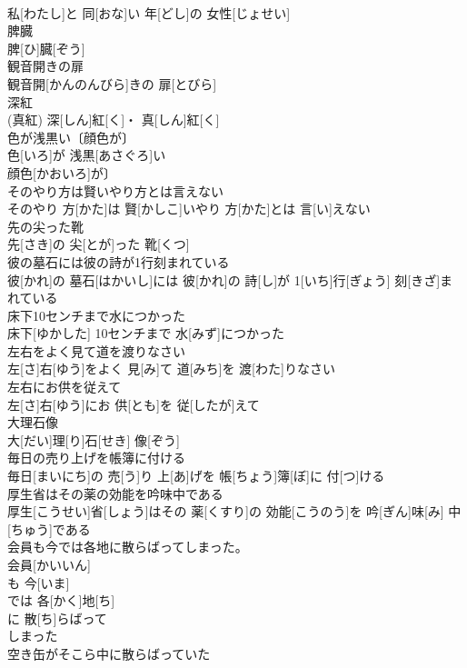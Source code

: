 \documentclass[8pt]{extreport}
\begin{document}
\begin{CJK}{UTF8}{min}
\\	私[わたし]と 同[おな]い 年[どし]の 女性[じょせい]
\\	脾臓	
\\	脾[ひ]臓[ぞう]
\\	観音開きの扉	
\\	観音開[かんのんびら]きの 扉[とびら]
\\	深紅	
\\	(真紅)	深[しん]紅[く]・ 真[しん]紅[く]
\\	色が浅黒い〔顔色が〕	
\\	色[いろ]が 浅黒[あさぐろ]い
\\	顔色[かおいろ]が〕
\\	そのやり方は賢いやり方とは言えない	
\\	そのやり 方[かた]は 賢[かしこ]いやり 方[かた]とは 言[い]えない
\\	先の尖った靴	
\\	先[さき]の 尖[とが]った 靴[くつ]
\\	彼の墓石には彼の詩が1行刻まれている	
\\	彼[かれ]の 墓石[はかいし]には 彼[かれ]の 詩[し]が 1[いち]行[ぎょう] 刻[きざ]まれている
\\	床下10センチまで水につかった	
\\	床下[ゆかした] 10センチまで 水[みず]につかった
\\	左右をよく見て道を渡りなさい	
\\	左[さ]右[ゆう]をよく 見[み]て 道[みち]を 渡[わた]りなさい
\\	左右にお供を従えて	
\\	左[さ]右[ゆう]にお 供[とも]を 従[したが]えて
\\	大理石像	
\\	大[だい]理[り]石[せき] 像[ぞう]
\\	毎日の売り上げを帳簿に付ける	
\\	毎日[まいにち]の 売[う]り 上[あ]げを 帳[ちょう]簿[ぼ]に 付[つ]ける
\\	厚生省はその薬の効能を吟味中である	
\\	厚生[こうせい]省[しょう]はその 薬[くすり]の 効能[こうのう]を 吟[ぎん]味[み] 中[ちゅう]である
\\	会員も今では各地に散らばってしまった。	
\\	会員[かいいん]
\\	も 今[いま]
\\	では 各[かく]地[ち]
\\	に 散[ち]らばって
\\	しまった
\\	空き缶がそこら中に散らばっていた	

\end{CJK}
\end{document}
